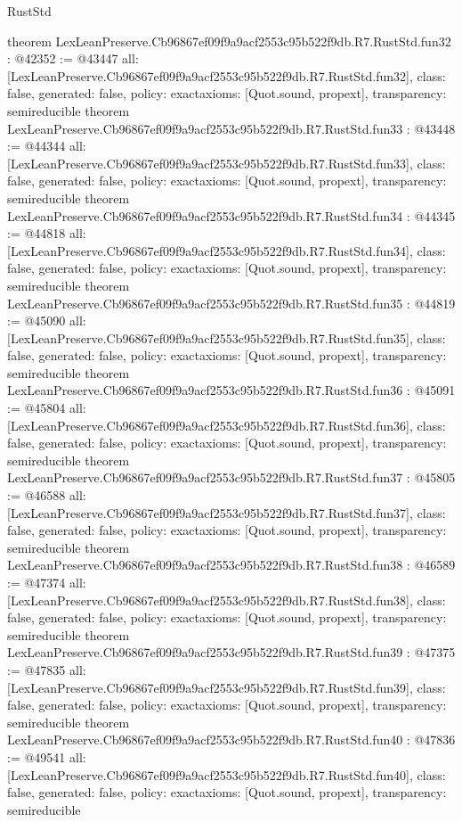 \begin{lexlean}{RustStd}
\begin{coremodule}
{}
theorem LexLeanPreserve.Cb96867ef09f9a9acf2553c95b522f9db.R7.RustStd.fun32 : @42352 := @43447 {
  all: [LexLeanPreserve.Cb96867ef09f9a9acf2553c95b522f9db.R7.RustStd.fun32],
  class: false,
  generated: false,
  policy: exact{axioms: [Quot.sound, propext]},
  transparency: semireducible
}
theorem LexLeanPreserve.Cb96867ef09f9a9acf2553c95b522f9db.R7.RustStd.fun33 : @43448 := @44344 {
  all: [LexLeanPreserve.Cb96867ef09f9a9acf2553c95b522f9db.R7.RustStd.fun33],
  class: false,
  generated: false,
  policy: exact{axioms: [Quot.sound, propext]},
  transparency: semireducible
}
theorem LexLeanPreserve.Cb96867ef09f9a9acf2553c95b522f9db.R7.RustStd.fun34 : @44345 := @44818 {
  all: [LexLeanPreserve.Cb96867ef09f9a9acf2553c95b522f9db.R7.RustStd.fun34],
  class: false,
  generated: false,
  policy: exact{axioms: [Quot.sound, propext]},
  transparency: semireducible
}
theorem LexLeanPreserve.Cb96867ef09f9a9acf2553c95b522f9db.R7.RustStd.fun35 : @44819 := @45090 {
  all: [LexLeanPreserve.Cb96867ef09f9a9acf2553c95b522f9db.R7.RustStd.fun35],
  class: false,
  generated: false,
  policy: exact{axioms: [Quot.sound, propext]},
  transparency: semireducible
}
theorem LexLeanPreserve.Cb96867ef09f9a9acf2553c95b522f9db.R7.RustStd.fun36 : @45091 := @45804 {
  all: [LexLeanPreserve.Cb96867ef09f9a9acf2553c95b522f9db.R7.RustStd.fun36],
  class: false,
  generated: false,
  policy: exact{axioms: [Quot.sound, propext]},
  transparency: semireducible
}
theorem LexLeanPreserve.Cb96867ef09f9a9acf2553c95b522f9db.R7.RustStd.fun37 : @45805 := @46588 {
  all: [LexLeanPreserve.Cb96867ef09f9a9acf2553c95b522f9db.R7.RustStd.fun37],
  class: false,
  generated: false,
  policy: exact{axioms: [Quot.sound, propext]},
  transparency: semireducible
}
theorem LexLeanPreserve.Cb96867ef09f9a9acf2553c95b522f9db.R7.RustStd.fun38 : @46589 := @47374 {
  all: [LexLeanPreserve.Cb96867ef09f9a9acf2553c95b522f9db.R7.RustStd.fun38],
  class: false,
  generated: false,
  policy: exact{axioms: [Quot.sound, propext]},
  transparency: semireducible
}
theorem LexLeanPreserve.Cb96867ef09f9a9acf2553c95b522f9db.R7.RustStd.fun39 : @47375 := @47835 {
  all: [LexLeanPreserve.Cb96867ef09f9a9acf2553c95b522f9db.R7.RustStd.fun39],
  class: false,
  generated: false,
  policy: exact{axioms: [Quot.sound, propext]},
  transparency: semireducible
}
theorem LexLeanPreserve.Cb96867ef09f9a9acf2553c95b522f9db.R7.RustStd.fun40 : @47836 := @49541 {
  all: [LexLeanPreserve.Cb96867ef09f9a9acf2553c95b522f9db.R7.RustStd.fun40],
  class: false,
  generated: false,
  policy: exact{axioms: [Quot.sound, propext]},
  transparency: semireducible
}
\end{coremodule}
\end{lexlean}
